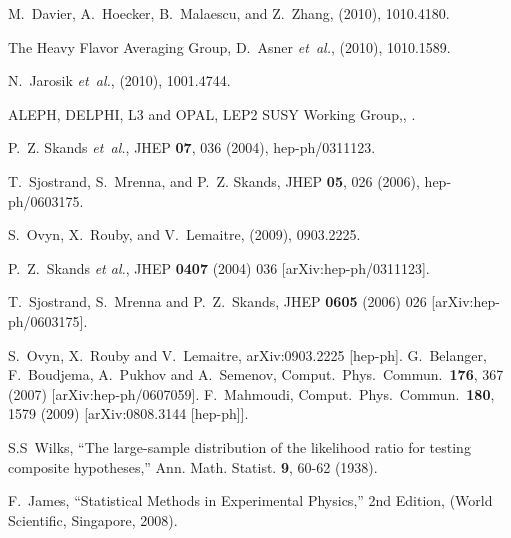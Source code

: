 \begin{thebibliography}{10}
M.~Davier, A.~Hoecker, B.~Malaescu, and Z.~Zhang,
\newblock (2010), 1010.4180.

The Heavy Flavor Averaging Group, D.~Asner {\em et~al.},
\newblock (2010), 1010.1589.

N.~Jarosik {\em et~al.},
\newblock (2010), 1001.4744.

ALEPH, DELPHI, L3 and OPAL, {LEP2 SUSY Working Group,},
.

P.~Z. Skands {\em et~al.},
\newblock JHEP {\bf 07}, 036 (2004), hep-ph/0311123.

T.~Sjostrand, S.~Mrenna, and P.~Z. Skands,
\newblock JHEP {\bf 05}, 026 (2006), hep-ph/0603175.

S.~Ovyn, X.~Rouby, and V.~Lemaitre,
\newblock (2009), 0903.2225.

  P.~Z.~Skands {\it et al.},
  JHEP {\bf 0407} (2004) 036
  [arXiv:hep-ph/0311123].

  T.~Sjostrand, S.~Mrenna and P.~Z.~Skands,
  JHEP {\bf 0605} (2006) 026
  [arXiv:hep-ph/0603175].

  S.~Ovyn, X.~Rouby and V.~Lemaitre,
  arXiv:0903.2225 [hep-ph].
%
  G.~Belanger, F.~Boudjema, A.~Pukhov and A.~Semenov,
  Comput.\ Phys.\ Commun.\  {\bf 176}, 367 (2007)
  [arXiv:hep-ph/0607059].
%
  F.~Mahmoudi,
  Comput.\ Phys.\ Commun.\  {\bf 180}, 1579 (2009)
  [arXiv:0808.3144 [hep-ph]].
%

S.S~Wilks, ``The large-sample distribution of the likelihood ratio for testing composite hypotheses,'' Ann. Math. Statist. {\bf 9}, 60-62 (1938).
	
F.~James, ``Statistical Methods in Experimental Physics,''  2nd Edition, (World Scientific, Singapore, 2008).


\end{thebibliography}
